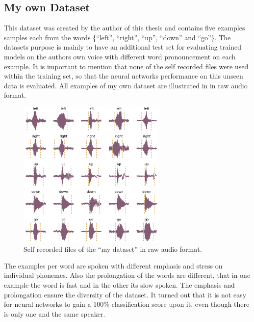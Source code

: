 


\subsection{My own Dataset}\label{sec:exp_dataset_my}
This dataset was created by the author of this thesis and contains five examples samples each from the words \{\enquote{left}, \enquote{right}, \enquote{up}, \enquote{down} and \enquote{go}\}.
The datasets purpose is mainly to have an additional test set for evaluating trained models on the authors own voice with different word pronouncement on each example.
It is important to mention that none of the self recorded files were used within the training set, so that the neural networks performance on this unseen data is evaluated.
All examples of my own dataset are illustrated in  in raw audio format.
\begin{figure}[!ht]
  \centering
    \includegraphics[width=0.65\textwidth]{./5_exp/figs/exp_dataset_wav_grid_my}
  \caption{Self recorded files of the \enquote{my dataset} in raw audio format.}
  \label{fig:exp_dataset_wav_grid_my}
\end{figure}
\FloatBarrier
\noindent
The examples per word are spoken with different emphasis and stress on individual phonemes.
Also the prolongation of the words are different, that in one example the word is fast and in the other its slow spoken.
The emphasis and prolongation ensure the diversity of the dataset. 
It turned out that it is not easy for neural networks to gain a $100\%$ classification score upon it, even though there is only one and the same speaker.


